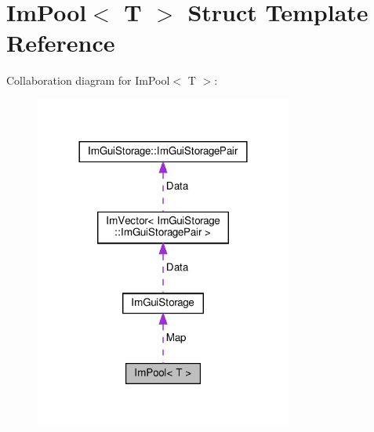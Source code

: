 \hypertarget{structImPool}{}\section{Im\+Pool$<$ T $>$ Struct Template Reference}
\label{structImPool}


Collaboration diagram for Im\+Pool$<$ T $>$\+:\nopagebreak
\begin{figure}[H]
\begin{center}
\leavevmode
\includegraphics[width=240pt]{structImPool__coll__graph}
\end{center}
\end{figure}
